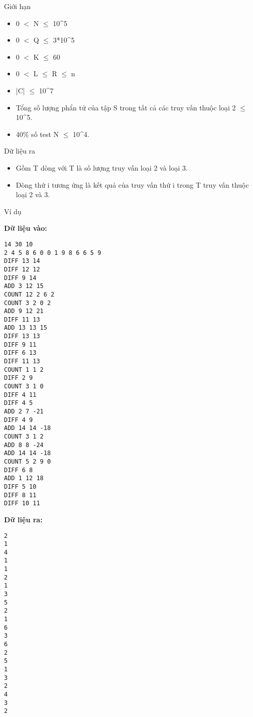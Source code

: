      Giới hạn    
\begin{itemize}
	\item      0 $<$ N  $\le$  10^5    
	\item      0 $<$ Q  $\le$  3*10^5    
	\item      0 $<$ K  $\le$  60    
	\item      0 $<$ L  $\le$  R  $\le$  n    
	\item      |C|  $\le$  10^7    
	\item      Tổng số lượng phẩn tử của tập S trong tất cả các truy vấn thuộc loại 2  $\le$  10^5.    
	\item      40\% số test N  $\le$  10^4.    
\end{itemize}






     Dữ liệu ra    
\begin{itemize}
	\item      Gồm T dòng với T là số lượng truy vấn loại 2 và loại 3.    
	\item      Dòng thứ i tương ứng là kết quả của truy vấn thứ i trong T truy vấn thuộc loại 2 và 3.    
\end{itemize}






     Ví dụ    

\textbf{      Dữ liệu vào:     }
\begin{verbatim}
14 30 10
2 4 5 8 6 0 0 1 9 8 6 6 5 9 
DIFF 13 14
DIFF 12 12
DIFF 9 14
ADD 3 12 15
COUNT 12 2 6 2 
COUNT 3 2 0 2 
ADD 9 12 21
DIFF 11 13
ADD 13 13 15
DIFF 13 13
DIFF 9 11
DIFF 6 13
DIFF 11 13
COUNT 1 1 2 
DIFF 2 9
COUNT 3 1 0 
DIFF 4 11
DIFF 4 5
ADD 2 7 -21
DIFF 4 9
ADD 14 14 -18
COUNT 3 1 2 
ADD 8 8 -24
ADD 14 14 -18
COUNT 5 2 9 0 
DIFF 6 8
ADD 1 12 18
DIFF 5 10
DIFF 8 11
DIFF 10 11\end{verbatim}






\textbf{      Dữ liệu ra:     }
\begin{verbatim}
2
1
4
1
1
2
1
3
5
2
1
6
3
6
2
5
1
3
2
4
3
2\end{verbatim}

